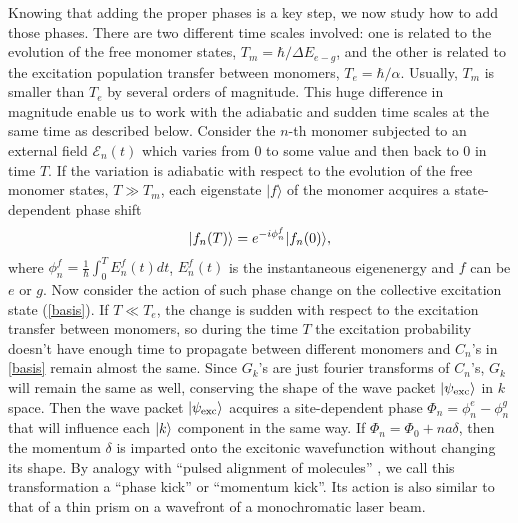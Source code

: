 Knowing that adding the proper phases is a key step, we now study how to add those phases. There are two
 different time scales involved: one is related to the evolution of the free monomer states, 
$T_m = \hbar/\Delta E_{e-g}$, and the other is related to the excitation population transfer between monomers,
 $T_e = \hbar/\alpha$. Usually, $T_m$ is smaller than $T_e$ by several orders of magnitude. This huge
 difference in magnitude enable us to work with the adiabatic and sudden time scales at the same time as described below. 
Consider  the $n$-th monomer subjected to an external field
$\mathcal{E}_n(t)$ which varies from 0 to some value and then back
to 0 in time $T$. If the variation is adiabatic with respect to
the evolution of the free monomer states, $T\gg T_m$, each eigenstate $|f\rangle$ of the monomer acquires a
state-dependent phase shift \cite{adiabatic-theo}
%
\begin{eqnarray}
| f_n (T) \rangle = e^{-i \phi_{n}^f}| f_n(0) \rangle,
\label{adiabatic-theorem} \label{phase}
\end{eqnarray}
%
where $\phi_{n}^f = \frac{1}{\hbar}\int_{0}^{T} E_{n}^f(t )dt$,
$E_{n}^f (t)$ is the instantaneous eigenenergy and $f$ can be $e$
or $g$.
Now consider the action of such phase change on the collective
excitation state (\ref{basis}). If $T\ll T_e$, the
change is sudden with respect to the excitation transfer between
monomers, so during the time $T$ the excitation probability doesn't have enough time to propagate 
between different monomers and $C_n$'s in \autoref{basis} remain almost the same. Since $G_k$'s are just fourier
transforms of $C_n$'s, $G_k$ will remain the same as well, conserving the shape of the wave packet $|\psi_{\rm exc}\rangle$ in $k$ space. 
 Then the wave packet $|\psi_{\rm exc}\rangle$ acquires a site-dependent
phase $\Phi_n = \phi_{n}^e-\phi_{n}^g$ that will influence each $| k \rangle$ component in the same way. 
If $\Phi_n = \Phi_0 + n a\delta $, then the momentum $\delta$ is imparted onto the
excitonic wavefunction without changing its shape. By analogy with ``pulsed alignment of
molecules'' \cite{alignment-review}, we call this transformation a
``phase kick'' or ``momentum kick''. Its action is also similar to
that of a thin prism on a wavefront of a monochromatic laser beam.

